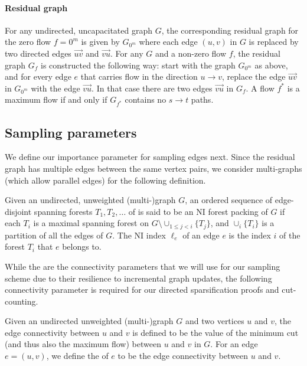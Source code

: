 \documentclass[11pt,a4paper]{article}
\begin{document}
\paragraph*{Residual graph}
For any undirected, uncapacitated graph $G$, the corresponding residual graph for the zero flow $f=0^m$ is given by $G_{0^m}$ where each edge $(u,v)$ in $G$ is replaced by two directed edges $\vec{uv}$ and $\vec{vu}$. For any $G$ and a non-zero flow $f$, the residual graph $G_f$ is constructed the following way: start with the graph $G_{0^m}$ as above, and for every edge $e$ that carries flow in the direction $u \to v$, replace the edge $\vec{uv}$ in $G_{0^m}$ with the edge $\vec{vu}$.
In that case there are two edges $\vec{vu}$ in $G_f$.
A flow $f^*$ is a maximum flow if and only if $G_{f^*}$ contains no $s \to t$ paths.

\subsection{Sampling parameters}
\label{sec:samplingparameters}

We define our importance parameter for sampling edges next.
Since the residual graph has multiple edges between the same vertex pairs, we consider multi-graphs (which allow parallel edges) for the following definition.

\begin{definition}
\label{def:niindex}
Given an undirected, unweighted (multi-)graph $G$, an ordered sequence of edge-disjoint spanning forests $T_1, T_2, \ldots$ of is said to be an NI forest packing of $G$ if each $T_i$ is a maximal spanning forest on $G \setminus \cup_{1 \le j < i} \{ T_j \}$, and $\cup_i \{  T_i \}$ is a partition of all the edges of $G$. The NI index $\ell_e$ of an edge $e$ is the index $i$ of the forest $T_i$ that $e$ belongs to.
\end{definition}

While the \niindices are the connectivity parameters that we will use for our sampling scheme due to their resilience to incremental graph updates, the following connectivity parameter is required for our directed sparsification proofs and cut-counting.

\begin{definition}
\label{def:edgeconnectivity}
Given an undirected unweighted (multi-)graph $G$ and two vertices $u$ and $v$, the edge connectivity between $u$ and $v$ is defined to be the value of the minimum cut (and thus also the maximum flow) between $u$ and $v$ in $G$.
For an edge $e = (u,v)$, we define the \edgeconnectivity of $e$ to be the edge connectivity between $u$ and $v$.
\end{definition}
\end{document}
